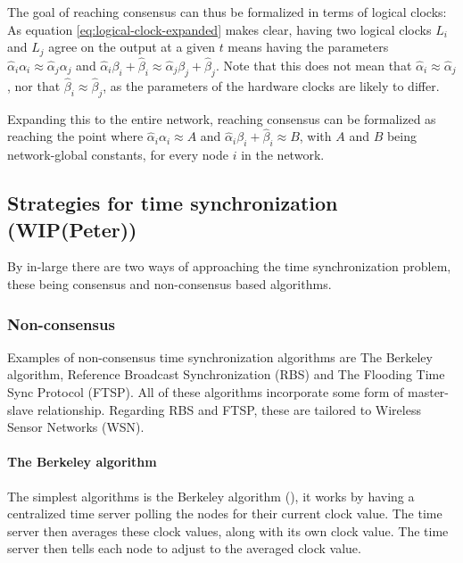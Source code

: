 \documentclass[a4paper,12pt]{article}
\begin{document}
The goal of reaching consensus can thus be formalized in terms of logical clocks: As equation \ref{eq:logical-clock-expanded} makes clear, having two logical clocks $L_i$ and $L_j$ agree on the output at a given $t$ means having the parameters $\hat\alpha_i \alpha_i \approx \hat\alpha_j \alpha_j$ and $\hat\alpha_i \beta_i + \hat\beta_i \approx \hat\alpha_j \beta_j + \hat\beta_j$. Note that this does not mean that $\hat\alpha_i \approx \hat\alpha_j$, nor that $\hat\beta_i \approx \hat\beta_j$, as the parameters of the hardware clocks are likely to differ.

Expanding this to the entire network, reaching consensus can be formalized as reaching the point where $\hat\alpha_i \alpha_i \approx A$ and $\hat\alpha_i \beta_i + \hat\beta_i \approx B$, with $A$ and $B$ being network-global constants, for every node $i$ in the network.


\subsection{Strategies for time synchronization (WIP(Peter))}

By in-large there are two ways of approaching the time synchronization problem, these being consensus and non-consensus based algorithms.

    \subsubsection{Non-consensus}
    Examples of non-consensus time synchronization algorithms are The Berkeley algorithm, Reference Broadcast Synchronization (RBS) and The Flooding Time Sync Protocol (FTSP). All of these algorithms incorporate some form of master-slave relationship. Regarding RBS and FTSP, these are tailored to Wireless Sensor Networks (WSN).
    
    \paragraph{The Berkeley algorithm} The simplest algorithms is the Berkeley algorithm (\cite{Gusella89}), it works by having a centralized time server polling the nodes for their current clock value. The time server then averages these clock values, along with its own clock value. The time server then tells each node to adjust to the averaged clock value. 
    
\end{document}
